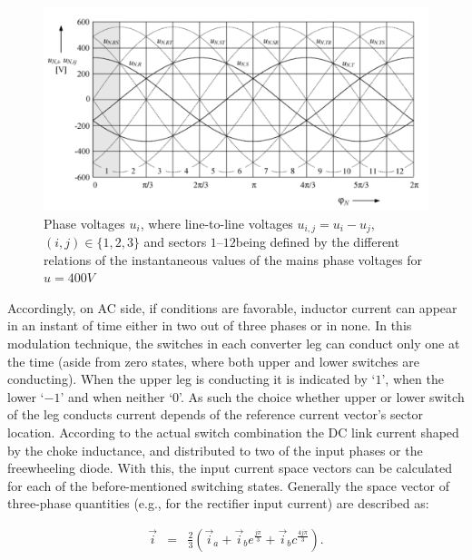 \begin{figure}[!ht]
        \centering
        \includegraphics[width=\textwidth]{EMPC_PNG_Pics/Waves.png}
        \caption{Phase voltages $u_{i}$, where line-to-line voltages $u_{i,j}=u_i-u_j$, $(i,j)\in\{1,2,3\}$ and sectors $1–12$being defined by the different relations of the instantaneous values of the mains phase voltages for $u = 400 V$}
        \label{BASICCSR:fig:waves}
    \end{figure}
		
		Accordingly, on AC side, if conditions are favorable, inductor current can appear in an instant of time either in two out
of three phases or in none. In this modulation technique, the switches in each converter leg can conduct only one at the time (aside from zero states, where both upper and lower switches are conducting). When the upper leg is conducting it is indicated by `$1$', when the lower  `$-1$' and when neither `$0$'. As such the choice whether upper or lower switch of the leg conducts current depends of the reference current vector's sector location. 
According to the actual switch combination the DC link current shaped by the choke inductance, and distributed to two of the input phases or the freewheeling diode. With this, the input current space vectors can be calculated for each of the before-mentioned switching states. Generally the space vector of three-phase quantities (e.g., for the rectifier input current) are described as:

\begin{equation}
        \begin{array}{rcl}
            \vec{i}&=&\frac{2}{3}\left(\vec{i}_a+\vec{i}_be^{\frac{j\pi}{3}}+\vec{i}_bc^{\frac{4j\pi}{3}}\right).\\
        \end{array}
        \label{BASICCSR:eqn:currents}
    \end{equation}
		
